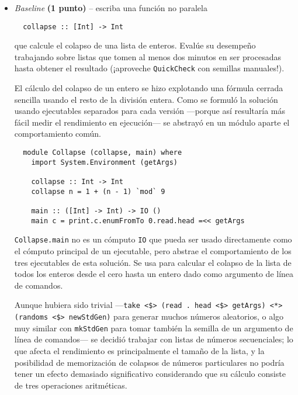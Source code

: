 \documentclass[11pt,fleqn]{article}
\newenvironment{answer}{%
  \def\FrameCommand{\fboxsep=\FrameSep \fcolorbox{black}{midgrey}}%
  \color{black}\MakeFramed {\FrameRestore}}%
 {\endMakeFramed}
\begin{document}
\begin{itemize}
\item
  \emph{Baseline} \textbf{(1 punto)} -- escriba una función no paralela

\begin{lstlisting}
  collapse :: [Int] -> Int
\end{lstlisting}

  que calcule el colapso de una lista de enteros. Evalúe su
  desempeño trabajando sobre listas que tomen al menos dos
  minutos en ser procesadas hasta obtener el resultado
  (¡aproveche \verb=QuickCheck= con semillas manuales!).

\begin{answer}
  El cálculo del colapso de un entero se hizo explotando una fórmula
  cerrada sencilla usando el resto de la división entera.  Como se
  formuló la solución usando ejecutables separados para cada versión
  ---porque así resultaría más fácil medir el rendimiento en
  ejecución--- se abstrayó en un módulo aparte el comportamiento común.

\begin{lstlisting}
  module Collapse (collapse, main) where
    import System.Environment (getArgs)

    collapse :: Int -> Int
    collapse n = 1 + (n - 1) `mod` 9

    main :: ([Int] -> Int) -> IO ()
    main c = print.c.enumFromTo 0.read.head =<< getArgs
\end{lstlisting}

  \texttt{Collapse.main} no es un cómputo \texttt{IO} que pueda ser
  usado directamente como el cómputo principal de un ejecutable, pero
  abstrae el comportamiento de los tres ejecutables de esta solución.
  Se usa para calcular el colapso de la lista de todos los enteros desde
  el cero hasta un entero dado como argumento de línea de comandos.

  Aunque hubiera sido trivial ---\texttt{take <\$> (read . head <\$>
  getArgs) <*> (randoms <\$> newStdGen)} para generar muchos números
  aleatorios, o algo muy similar con \texttt{mkStdGen} para tomar
  también la semilla de un argumento de línea de comandos--- se decidió
  trabajar con listas de números secuenciales; lo que afecta el
  rendimiento es principalmente el tamaño de la lista, y la posibilidad
  de memorización de colapsos de números particulares no podría tener un
  efecto demasiado significativo considerando que su cálculo consiste de
  tres operaciones aritméticas.


\end{answer}
\end{itemize}
\end{document}
